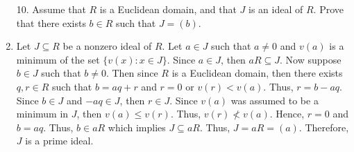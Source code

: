 \documentclass[12pt]{article}
\makeatletter
\theoremstyle{definition}
\theoremstyle{remark}
\renewenvironment{proof}[1][\proofname]{\par
  \pushQED{\qed}%
  \normalfont \topsep6\p@\@plus6\p@\relax
  \list{}{\leftmargin=0mm
          \rightmargin=4mm
          \settowidth{\itemindent}{\itshape#1}%
          \labelwidth=\itemindent
          \parsep=0pt \listparindent=\parindent 
  }
  \item[\hskip\labelsep
        \itshape
    #1\@addpunct{.}]\ignorespaces
}{%
  \popQED\endlist\@endpefalse
}
\let\oldproofname=\proofname
\renewcommand{\proofname}{\bf{\textit{\oldproofname}}}
\makeatother
\begin{document}
\begin{enumerate}[leftmargin=*]
        \item[10.] Assume that $R$ is a Euclidean domain, and that $J$ is an ideal of $R$. Prove that there exists $b\in R$ such that $J=(b)$.
            \begin{proof}
                Let $J\subseteq R$ be a nonzero ideal of $R$. Let $a\in J$ such that $a\neq 0$ and $v(a)$ is a minimum of the set $\{v(x)\colon x\in J\}$. Since $a\in J$, then $aR\subseteq J$. Now suppose $b\in J$ such that $b\neq 0$. Then since $R$ is a Euclidean domain, then there exists $q,r\in R$ such that $b=aq+r$ and $r=0$ or $v(r)<v(a)$. Thus, $r=b-aq$. Since $b\in J$ and $-aq\in J$, then $r\in J$. Since $v(a)$ was assumed to be a minimum in $J$, then $v(a)\leq v(r)$. Thus, $v(r)\not< v(a)$. Hence, $r=0$ and $b=aq$. Thus, $b\in aR$ which implies $J\subseteq aR$. Thus, $J=aR=(a)$. Therefore, $J$ is a prime ideal. 
            \end{proof}
    \end{enumerate}
    
\end{document}
